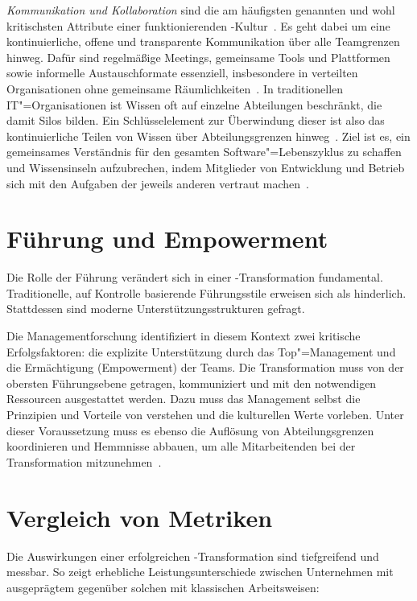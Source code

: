 \emph{Kommunikation und Kollaboration} sind die am häufigsten genannten und wohl kritischsten Attribute einer funktionierenden \DO-Kultur~\cites[313]{nay24}[4]{kre22}.
Es geht dabei um eine kontinuierliche, offene und transparente Kommunikation über alle Teamgrenzen hinweg.
Dafür sind regelmäßige Meetings, gemeinsame Tools und Plattformen sowie informelle Austauschformate essenziell, insbesondere in verteilten Organisationen ohne gemeinsame Räumlichkeiten~\cites[284]{kar24}[282]{mas18}[528]{win23}.
In traditionellen IT"=Organisationen ist Wissen oft auf einzelne Abteilungen beschränkt, die damit Silos bilden.
Ein Schlüsselelement zur Überwindung dieser ist also das kontinuierliche Teilen von Wissen über Abteilungsgrenzen hinweg~\cites[285]{kar24}.
Ziel ist es, ein gemeinsames Verständnis für den gesamten Software"=Lebenszyklus zu schaffen und Wissensinseln aufzubrechen, indem Mitglieder von Entwicklung und Betrieb sich mit den Aufgaben der jeweils anderen vertraut machen~\cite[528]{win23}.

\section{Führung und Empowerment}

Die Rolle der Führung verändert sich in einer \DO-Transformation fundamental.
Traditionelle, auf Kontrolle basierende Führungsstile erweisen sich als hinderlich.
Stattdessen sind moderne Unterstützungsstrukturen gefragt.

Die Managementforschung identifiziert in diesem Kontext zwei kritische Erfolgsfaktoren: die explizite Unterstützung durch das Top"=Management und die Ermächtigung (\foreignlanguage{american}{Empowerment}) der Teams.
Die Transformation muss von der obersten Führungsebene getragen, kommuniziert und mit den notwendigen Ressourcen ausgestattet werden. Dazu muss das Management selbst die Prinzipien und Vorteile von \DO verstehen und die kulturellen Werte vorleben.
Unter dieser Voraussetzung muss es ebenso die Auflösung von Abteilungsgrenzen koordinieren und Hemmnisse abbauen, um alle Mitarbeitenden bei der Transformation mitzunehmen~\cites[285]{kar24}[313]{nay24}.

\section{Vergleich von Metriken}

Die Auswirkungen einer erfolgreichen \DO-Transformation sind tiefgreifend und messbar.
So zeigt  erhebliche Leistungsunterschiede zwischen Unternehmen mit ausgeprägtem \DO gegenüber solchen mit klassischen Arbeitsweisen:

